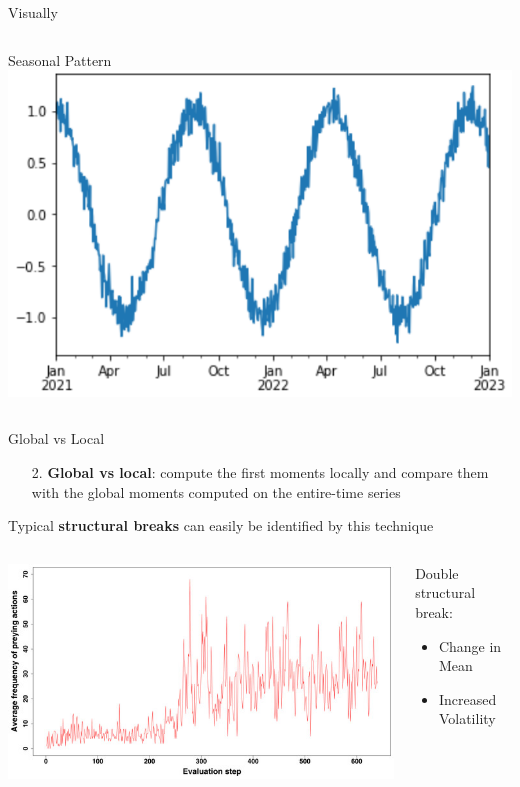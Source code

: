 \documentclass{beamer}
\begin{document}
\begin{frame}{Visually}
\begin{columns}
    \begin{column}{.33\textwidth}
    \centering
    Seasonal Pattern
    \includegraphics[width=\textwidth]{static/course_2_img/seasonal.PNG}     
    \end{column}
\end{columns}
\end{frame}

\begin{frame}{Global vs Local}
\begin{enumerate}
    \item[2.] \textbf{Global vs local}: compute the first moments locally and compare them with the global moments computed on the entire-time series
\end{enumerate}
Typical \textbf{structural breaks} can easily be identified by this technique 
\medskip

\begin{columns}
    \begin{column}{.7\textwidth}
        \includegraphics[width=\textwidth]{static/course_2_img/structural_break.jpg}  
    \end{column}
    \begin{column}{.3\textwidth}
        Double structural break:
\begin{itemize}
    \item Change in Mean 
    \item Increased Volatility
\end{itemize}
    \end{column}
\end{columns}
\end{frame}
\end{document}
